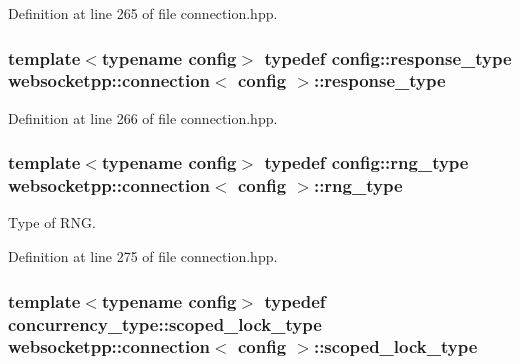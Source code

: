 Definition at line 265 of file connection.\+hpp.

\hypertarget{classwebsocketpp_1_1connection_a0d2d5908eaaea749bcf8fd0939b05d3b}{}
\subsubsection[{response\+\_\+type}]{\setlength{\rightskip}{0pt plus 5cm}template$<$typename config$>$ typedef config\+::response\+\_\+type {\bf websocketpp\+::connection}$<$ config $>$\+::{\bf response\+\_\+type}}\label{classwebsocketpp_1_1connection_a0d2d5908eaaea749bcf8fd0939b05d3b}


Definition at line 266 of file connection.\+hpp.

\hypertarget{classwebsocketpp_1_1connection_afc276f2f61d5b1acfadc64f91b3f89e5}{}
\subsubsection[{rng\+\_\+type}]{\setlength{\rightskip}{0pt plus 5cm}template$<$typename config$>$ typedef config\+::rng\+\_\+type {\bf websocketpp\+::connection}$<$ config $>$\+::{\bf rng\+\_\+type}}\label{classwebsocketpp_1_1connection_afc276f2f61d5b1acfadc64f91b3f89e5}


Type of R\+N\+G. 



Definition at line 275 of file connection.\+hpp.

\hypertarget{classwebsocketpp_1_1connection_a22ec65b3e3d5159ea61f885066e12caa}{}
\subsubsection[{scoped\+\_\+lock\+\_\+type}]{\setlength{\rightskip}{0pt plus 5cm}template$<$typename config$>$ typedef concurrency\+\_\+type\+::scoped\+\_\+lock\+\_\+type {\bf websocketpp\+::connection}$<$ config $>$\+::{\bf scoped\+\_\+lock\+\_\+type}}\label{classwebsocketpp_1_1connection_a22ec65b3e3d5159ea61f885066e12caa}


